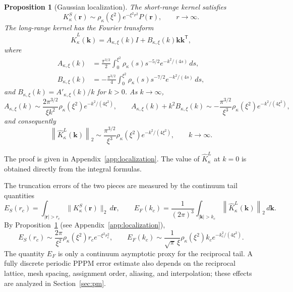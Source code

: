 \documentclass[11pt]{article}
\theoremstyle{plain}
\newtheorem{proposition}{Proposition}[section]
\newcommand{\rr}{\bm r}
\newcommand{\kk}{\bm k}
\newcommand{\PP}{P}
\newcommand{\Id}{I}
\DeclareRobustCommand{\_}{\textunderscore\allowbreak}
\begin{document}
\begin{proposition}[Gaussian localization]
\label{prop:localization}
The short-range kernel satisfies
\begin{equation}
\label{eq:KS-asym}
K_\kappa^S(\rr)
\sim
\rho_\kappa(\xi^2)
e^{-\xi^2r^2}
\PP(\rr),
\qquad
r\to\infty.
\end{equation}
The long-range kernel has the Fourier transform
\begin{equation}
\label{eq:KL-fourier}
\widehat K_\kappa^L(\kk)
=
A_{\kappa,\xi}(k)\Id
+
B_{\kappa,\xi}(k)\kk\kk^{\mathsf T},
\end{equation}
where
\begin{align}
A_{\kappa,\xi}(k)
&=
\frac{\pi^{3/2}}{2}
\int_0^{\xi^2}
\rho_\kappa(s)s^{-5/2}
e^{-k^2/(4s)}\,ds,
\\
B_{\kappa,\xi}(k)
&=
-\frac{\pi^{3/2}}{4}
\int_0^{\xi^2}
\rho_\kappa(s)s^{-7/2}
e^{-k^2/(4s)}\,ds,
\end{align}
and $B_{\kappa,\xi}(k)=A'_{\kappa,\xi}(k)/k$ for $k>0$. As $k\to\infty$,
\begin{equation}
\label{eq:lambda-par-asym}
A_{\kappa,\xi}(k)
\sim
\frac{2\pi^{3/2}}{\xi k^2}
\rho_\kappa(\xi^2)
e^{-k^2/(4\xi^2)},
\qquad
A_{\kappa,\xi}(k)
+
k^2B_{\kappa,\xi}(k)
\sim
-
\frac{\pi^{3/2}}{\xi^3}
\rho_\kappa(\xi^2)
e^{-k^2/(4\xi^2)},
\end{equation}
and consequently
\begin{equation}
\label{eq:KL-decay}
\left\|
\widehat K_\kappa^L(\kk)
\right\|_2
\sim
\frac{\pi^{3/2}}{\xi^3}
\rho_\kappa(\xi^2)
e^{-k^2/(4\xi^2)},
\qquad
k\to\infty.
\end{equation}
\end{proposition}

The proof is given in Appendix~\ref{app:localization}. The value of
$\widehat K_\kappa^L$ at \(k=0\) is obtained directly from the integral
formulas.

The truncation errors of the two pieces are measured by the continuum
tail quantities
\begin{equation}
\label{eq:EF}
E_S(r_c)
=
\int_{|\rr|>r_c}
\|K_\kappa^S(\rr)\|_2\,d\rr,
\qquad
E_F(k_c)
=
\frac{1}{(2\pi)^3}
\int_{|\kk|>k_c}
\left\|
\widehat K_\kappa^L(\kk)
\right\|_2\,d\kk.
\end{equation}
By Proposition~\ref{prop:localization} (see Appendix~\ref{app:localization}),
\begin{equation}
\label{eq:tails}
E_S(r_c)
\sim
\frac{2\pi}{\xi^2}
\rho_\kappa(\xi^2)
r_c e^{-\xi^2r_c^2},
\qquad
E_F(k_c)
\sim
\frac{1}{\sqrt{\pi}\,\xi}
\rho_\kappa(\xi^2)
k_c
e^{-k_c^2/(4\xi^2)}.
\end{equation}
The quantity \(E_F\) is only a continuum asymptotic proxy for the
reciprocal tail. A fully discrete periodic PPPM error estimate also depends
on the reciprocal lattice, mesh spacing, assignment order, aliasing, and
interpolation; these effects are analyzed in Section~\ref{sec:pm}.
\end{document}
